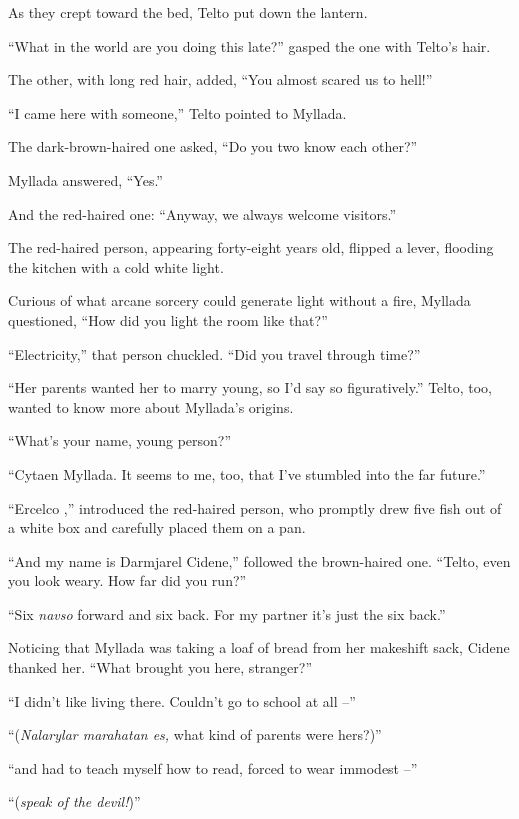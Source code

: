 As they crept toward the bed, Telto put down the lantern.

\centeredstars

``What in the world are you doing this late?'' gasped the one with Telto's hair.

The other, with long red hair, added, ``You almost scared us to hell!''

``I came here with someone,'' Telto pointed to Myllada.

The dark-brown-haired one asked, ``Do you two know each other?''

Myllada answered, ``Yes.''

And the red-haired one: ``Anyway, we always welcome visitors.''

The red-haired person, appearing forty-eight years old, flipped a lever, flooding the kitchen with a cold white light.

Curious of what arcane sorcery could generate light without a fire, Myllada questioned, ``How did you light the room like that?''

``Electricity,'' that person chuckled. ``Did you travel through time?''

``Her parents wanted her to marry young, so I'd say so figuratively.'' Telto, too, wanted to know more about Myllada's origins.

``What's your name, young person?''

``Cytaen Myllada. It seems to me, too, that I've stumbled into the far future.''

``Ercelco \sypros,'' introduced the red-haired person, who promptly drew five fish out of a white box and carefully placed them on a pan.

``And my name is Darmjarel Cidene,'' followed the brown-haired one. ``Telto, even you look weary. How far did you run?''

``Six \emph{navso} forward and six back. For my partner it's just the six back.''

Noticing that Myllada was taking a loaf of bread from her makeshift sack, Cidene thanked her. ``What brought you here, stranger?''

``I didn't like living there. Couldn't go to school at all --''

``(\emph{Nalarylar marahatan es,} what kind of parents were hers?)''

``and had to teach myself how to read, forced to wear immodest --''

``(\emph{speak of the devil!})''

